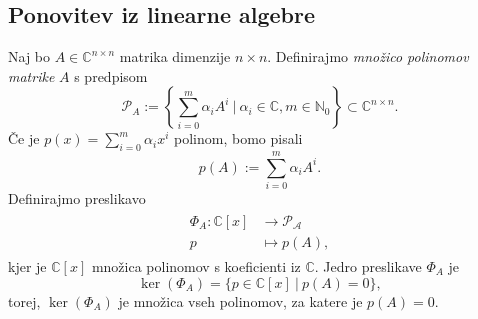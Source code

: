\documentclass[mat1]{fmfdelo}
\newcommand{\N}{\mathbb N}
\newcommand{\C}{\mathbb C}
\begin{document}
\subsection{Ponovitev iz linearne algebre}\label{linearnaAlgebra}
Naj bo $A \in \C^{n \times n}$ matrika dimenzije $n \times n$. Definirajmo \emph{množico polinomov matrike} $A$ s predpisom
\begin{equation*}
    \mathcal{P}_A := \left\{ \sum_{i=0}^m \alpha_i A^i\ |\  \alpha_i \in \C, m \in \N_0 \right\} \subset \C^{n \times n}.
\end{equation*}
Če je $p(x) = \sum_{i=0}^m \alpha_i x^i$ polinom, bomo pisali
\begin{equation*}
    p(A) := \sum_{i=0}^m \alpha_i A^i.
\end{equation*}
Definirajmo preslikavo
\begin{align}
\begin{split}
    \Phi_A : \C [x] &\longrightarrow \mathcal{P_A} \\
    p &\longmapsto p(A),
\end{split}
\end{align}
kjer je $\C [x]$ množica polinomov s koeficienti iz $\C$. Jedro preslikave $\Phi_A$ je
\begin{equation*}
    \ker \left(\Phi_A\right) = \Big\{ p \in \C [x] \ | \  p(A) = 0 \Big\},
\end{equation*}
torej, $\ker\left(\Phi_A\right)$ je množica vseh polinomov, za katere je $p(A) = 0$.
\end{document}
